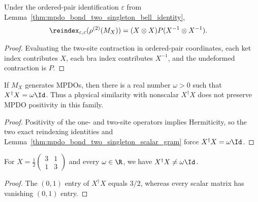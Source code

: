 \begin{lemma}%
    \label{thm:mpdo_bond_two_singleton_physical_two_site}
    \leanok
    Under the ordered-pair identification $\varepsilon$ from
    Lemma~\ref{thm:mpdo_bond_two_singleton_bell_identity},
    \begin{align}
        \reindex_{\varepsilon,\varepsilon}
        (\rho^{(2)}(M_X))
         & =(X\otimes X)P(X^{-1}\otimes X^{-1}).
        \notag
    \end{align}
\end{lemma}
\begin{proof}\leanok
    Evaluating the two-site contraction in ordered-pair coordinates, each ket
    index contributes $X$, each bra index contributes $X^{-1}$, and the
    undeformed contraction is $P$.
\end{proof}

\begin{lemma}%
    \label{thm:mpdo_bond_two_singleton_physical_scalar_gram}
    \leanok
    If $M_X$ generates MPDOs, then there is a real number $\omega>0$ such
    that $X^\dagger X=\omega\Id$. Thus a physical similarity with
    nonscalar $X^\dagger X$ does not preserve MPDO positivity in this family.
\end{lemma}
\begin{proof}\leanok
    Positivity of the one- and two-site operators implies Hermiticity, so the
    two exact reindexing identities and
    Lemma~\ref{thm:mpdo_bond_two_singleton_scalar_gram} force
    $X^\dagger X=\omega\Id$.
\end{proof}

\begin{lemma}%
    \label{lem:mpdo_bond_two_singleton_physical_nonscalar_gram}
    \leanok
    For $X=\frac12\begin{pmatrix}3&1\\1&3\end{pmatrix}$ and every
    $\omega\in\R$, we have $X^\dagger X\ne\omega\Id$.
\end{lemma}
\begin{proof}\leanok
    The $(0,1)$ entry of $X^\dagger X$ equals $3/2$, whereas every scalar
    matrix has vanishing $(0,1)$ entry.
\end{proof}

